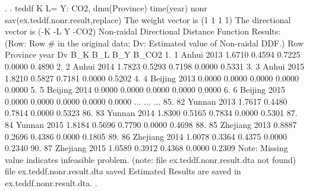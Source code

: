 . 
. teddf K L= Y: CO2, dmu(Province) time(year) nonr sav(ex.teddf.nonr.result,replace)
{\smallskip}
 The weight vector is (1 1 1 1)
{\smallskip}
 The directional vector is (-K -L Y -CO2)
{\smallskip}
{\smallskip}
 Non-raidal Directional Distance Function Results:
    (Row: Row \# in the original data; Dv: Estimated value of Non-raidal DDF.)
{\smallskip}
     {\TLC}
     {\VBAR} Row       Province   year       Dv      B_K      B_L      B_Y    B_CO2 {\VBAR}
     {\LFTT}
  1. {\VBAR}   1          Anhui   2013   1.6710   0.4594   0.7225   0.0000   0.4890 {\VBAR}
  2. {\VBAR}   2          Anhui   2014   1.7823   0.5293   0.7198   0.0000   0.5331 {\VBAR}
  3. {\VBAR}   3          Anhui   2015   1.8210   0.5827   0.7181   0.0000   0.5202 {\VBAR}
  4. {\VBAR}   4        Beijing   2013   0.0000   0.0000   0.0000   0.0000   0.0000 {\VBAR}
  5. {\VBAR}   5        Beijing   2014   0.0000   0.0000   0.0000   0.0000   0.0000 {\VBAR}
  6. {\VBAR}   6        Beijing   2015   0.0000   0.0000   0.0000   0.0000   0.0000 {\VBAR}
                                     ...
                                     ...
                                     ...
 85. {\VBAR}  82         Yunnan   2013   1.7617   0.4480   0.7814   0.0000   0.5323 {\VBAR}
 86. {\VBAR}  83         Yunnan   2014   1.8300   0.5165   0.7834   0.0000   0.5301 {\VBAR}
 87. {\VBAR}  84         Yunnan   2015   1.8184   0.5696   0.7790   0.0000   0.4698 {\VBAR}
 88. {\VBAR}  85       Zhejiang   2013   0.8887   0.2696   0.4386   0.0000   0.1805 {\VBAR}
 89. {\VBAR}  86       Zhejiang   2014   1.0078   0.3364   0.4375   0.0000   0.2340 {\VBAR}
 90. {\VBAR}  87       Zhejiang   2015   1.0589   0.3912   0.4368   0.0000   0.2309 {\VBAR}
     {\BLC}
Note: Missing value indicates infeasible problem.
(note: file ex.teddf.nonr.result.dta not found)
file ex.teddf.nonr.result.dta saved
{\smallskip}
Estimated Results are saved in ex.teddf.nonr.result.dta.
{\smallskip}
. 
